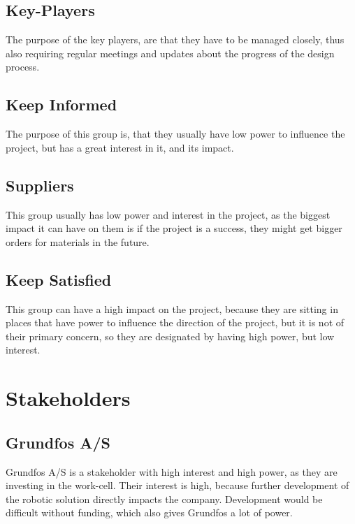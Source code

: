 \subsection{Key-Players}
The purpose of the key players, are that they have to be managed closely, thus also requiring regular meetings and updates about the progress of the design process.\\

\subsection{Keep Informed}
The purpose of this group is, that they usually have low power to influence the project, but has a great interest in it, and its impact.\\

\subsection{Suppliers}
This group usually has low power and interest in the project, as the biggest impact it can have on them is if the project is a success, they might get bigger orders for materials in the future.\\

\subsection{Keep Satisfied}
This group can have a high impact on the project, because they are sitting in places that have power to influence the direction of the project, but it is not of their primary concern, so they are designated by having high power, but low interest.\\

\section{Stakeholders}\label{ch:Stakeholders-main}

\subsection{Grundfos A/S}\label{ch:grundfosas-stake}
Grundfos A/S is a stakeholder with high interest and high power, as they are investing in the work-cell. Their interest is high, because further development of the robotic solution directly impacts the company. Development would be difficult without funding, which also gives Grundfos a lot of power. 

